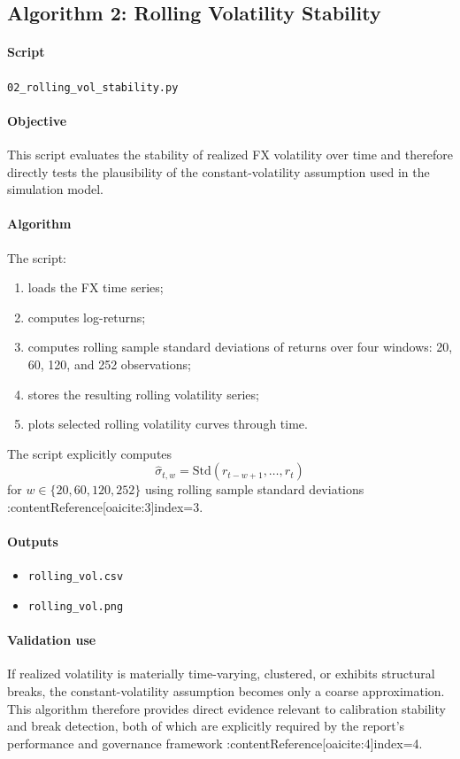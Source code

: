 	\subsection{Algorithm 2: Rolling Volatility Stability}
	
	\paragraph{Script}
	\texttt{02\_rolling\_vol\_stability.py}
	
	\paragraph{Objective}
	This script evaluates the stability of realized FX volatility over time and therefore directly tests the plausibility of the constant-volatility assumption used in the simulation model.
	
	\paragraph{Algorithm}
	The script:
	\begin{enumerate}
		\item loads the FX time series;
		\item computes log-returns;
		\item computes rolling sample standard deviations of returns over four windows: 20, 60, 120, and 252 observations;
		\item stores the resulting rolling volatility series;
		\item plots selected rolling volatility curves through time.
	\end{enumerate}
	
	The script explicitly computes
	\[
	\hat{\sigma}_{t,w} = \text{Std}\left(r_{t-w+1}, \dots, r_t\right)
	\]
	for \(w \in \{20,60,120,252\}\) using rolling sample standard deviations :contentReference[oaicite:3]{index=3}.
	
	\paragraph{Outputs}
	\begin{itemize}
		\item \texttt{rolling\_vol.csv}
		\item \texttt{rolling\_vol.png}
	\end{itemize}
	
	\paragraph{Validation use}
	If realized volatility is materially time-varying, clustered, or exhibits structural breaks, the constant-volatility assumption becomes only a coarse approximation. This algorithm therefore provides direct evidence relevant to calibration stability and break detection, both of which are explicitly required by the report’s performance and governance framework :contentReference[oaicite:4]{index=4}.
	
